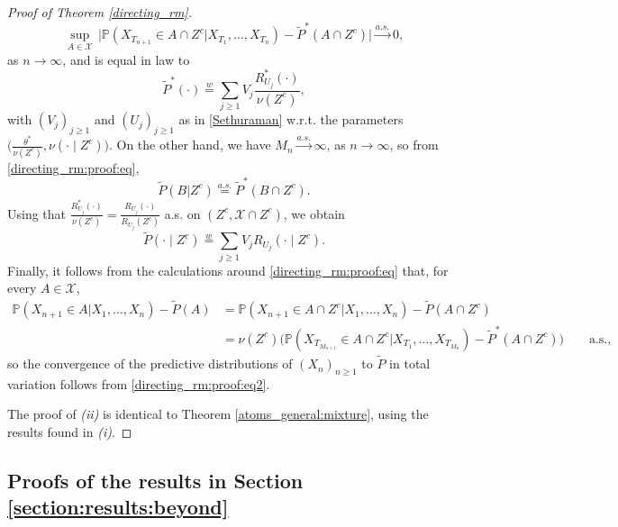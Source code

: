 \documentclass[a4paper]{article}
\theoremstyle{plain}
\theoremstyle{remark}
\theoremstyle{definition}
\begin{document}
\begin{proof}[Proof of Theorem \ref{directing_rm}]
\begin{equation}\label{directing_rm:proof:eq2}
\sup_{A\in\mathcal{X}}\,\bigl|\mathbb{P}(X_{T_{n+1}}\in A\cap Z^c|X_{T_1},\ldots,X_{T_n})-\tilde{P}^*(A\cap Z^c)\bigr|\overset{a.s.}{\longrightarrow}0,
\end{equation}
as $n\rightarrow\infty$, and is equal in law to
\[\tilde{P}^*(\cdot)\overset{w}{=}\sum_{j\geq1}V_j\frac{R^*_{U_j}(\cdot)}{\nu(Z^c)},\]
with $(V_j)_{j\geq1}$ and $(U_j)_{j\geq1}$ as in \eqref{Sethuraman} w.r.t. the parameters $\bigl(\frac{\theta^*}{\nu(Z^c)},\nu(\cdot\mid Z^c)\bigr)$. On the other hand, we have $M_n\overset{a.s.}{\longrightarrow}\infty$, as $n\rightarrow\infty$, so from \eqref{directing_rm:proof:eq},
\[\tilde{P}(B|Z^c)\overset{a.s.}{=}\tilde{P}^*(B\cap Z^c).\]
Using that $\frac{R_{U_j}^*(\cdot)}{\nu(Z^c)}=\frac{R_{U_j}(\cdot)}{R_{U_j}(Z^c)}$ a.s. on $(Z^c,\mathcal{X}\cap Z^c)$, we obtain
\[\tilde{P}(\cdot\mid Z^c)\overset{w}{=}\sum_{j\geq1}V_jR_{U_j}(\cdot\mid Z^c).\]
Finally, it follows from the calculations around \eqref{directing_rm:proof:eq} that, for every $A\in\mathcal{X}$,
\begingroup\allowdisplaybreaks
\begin{align*}
\mathbb{P}(X_{n+1}\in A|X_1,\ldots,X_n)-\tilde{P}(A)&=\mathbb{P}(X_{n+1}\in A\cap Z^c|X_1,\ldots,X_n)-\tilde{P}(A\cap Z^c)\\
&=\nu(Z^c)\bigl(\mathbb{P}(X_{T_{M_{n+1}}}\in A\cap Z^c|X_{T_1},\ldots,X_{T_{M_n}})-\tilde{P}^*(A\cap Z^c)\bigr)\qquad\mbox{a.s.},
\end{align*}
\endgroup
so the convergence of the predictive distributions of $(X_n)_{n\geq1}$ to $\tilde{P}$ in total variation follows from \eqref{directing_rm:proof:eq2}.

The proof of \textit{(ii)} is identical to Theorem \ref{atoms_general:mixture}, using the results found in \textit{(i)}.
\end{proof}

\subsection{Proofs of the results in Section \ref{section:results:beyond}}
\end{document}
